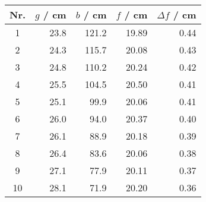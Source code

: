 \begin{tabular}{c|rrrr}
Nr. & $g$ / cm & $b$ / cm & $f$ / cm & $\Delta f$ / cm \\
\hline
1 & 23.8 & 121.2 & 19.89 & 0.44\\
2 & 24.3 & 115.7 & 20.08 & 0.43\\
3 & 24.8 & 110.2 & 20.24 & 0.42\\
4 & 25.5 & 104.5 & 20.50 & 0.41\\
5 & 25.1 & 99.9 & 20.06 & 0.41\\
6 & 26.0 & 94.0 & 20.37 & 0.40\\
7 & 26.1 & 88.9 & 20.18 & 0.39\\
8 & 26.4 & 83.6 & 20.06 & 0.38\\
9 & 27.1 & 77.9 & 20.11 & 0.37\\
10 & 28.1 & 71.9 & 20.20 & 0.36
\end{tabular}
